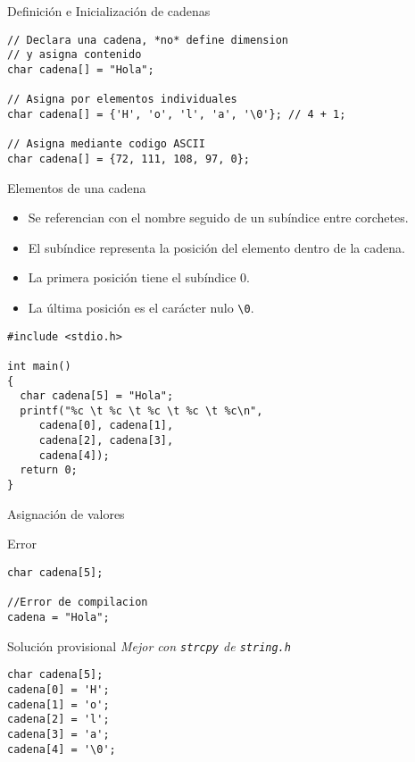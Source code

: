 \documentclass[xcolor={usenames,svgnames,dvipsnames}, aspectratio=169]{beamer}
\begin{document}
\begin{frame}[label={sec:orgb5c5882},fragile]{Definición e Inicialización de cadenas}
 \lstset{language=C,label= ,caption= ,captionpos=b,numbers=none}
\begin{lstlisting}
// Declara una cadena, *no* define dimension 
// y asigna contenido 
char cadena[] = "Hola"; 

// Asigna por elementos individuales
char cadena[] = {'H', 'o', 'l', 'a', '\0'}; // 4 + 1; 

// Asigna mediante codigo ASCII
char cadena[] = {72, 111, 108, 97, 0}; 
\end{lstlisting}
\end{frame}

\begin{frame}[label={sec:org9310c22},fragile]{Elementos de una cadena}
 \begin{itemize}
\item Se referencian con el nombre seguido de un subíndice entre corchetes.
\item El subíndice representa la posición del elemento dentro de la cadena.
\item La \alert{primera posición} tiene el \alert{subíndice 0}.
\item La \alert{última posición} es el carácter nulo \texttt{\textbackslash{}0}.
\end{itemize}

\lstset{language=C,label= ,caption= ,captionpos=b,numbers=none}
\begin{lstlisting}
#include <stdio.h>

int main()
{
  char cadena[5] = "Hola";
  printf("%c \t %c \t %c \t %c \t %c\n",
	 cadena[0], cadena[1],
	 cadena[2], cadena[3],
	 cadena[4]);
  return 0;
}
\end{lstlisting}
\end{frame}

\begin{frame}[label={sec:org64422d5},fragile]{Asignación de valores}
 \begin{block}{Error}
\lstset{language=C,label= ,caption= ,captionpos=b,numbers=none}
\begin{lstlisting}
char cadena[5];

//Error de compilacion
cadena = "Hola";
\end{lstlisting}
\end{block}

\begin{block}{Solución provisional}
\emph{Mejor con \texttt{strcpy} de \texttt{string.h}}

\lstset{language=C,label= ,caption= ,captionpos=b,numbers=none}
\begin{lstlisting}
char cadena[5]; 
cadena[0] = 'H'; 
cadena[1] = 'o'; 
cadena[2] = 'l'; 
cadena[3] = 'a'; 
cadena[4] = '\0';
\end{lstlisting}
\end{block}
\end{frame}
\end{document}
